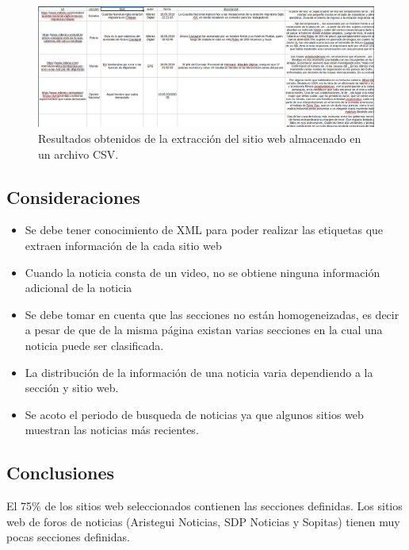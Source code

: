 \begin{figure}[H]
  \centering
  \includegraphics[scale=.27]{imagenes/Capitulo5/9}
  \caption{Resultados obtenidos de la extracción del sitio web almacenado en un archivo CSV.}
  \label{fig:nueve}
\end{figure}

\subsection{Consideraciones}
\begin{itemize}
  \item Se debe tener conocimiento de XML para poder realizar las etiquetas que extraen información de la cada sitio web
  \item Cuando la noticia consta de un video, no se obtiene ninguna información adicional de la noticia
  \item Se debe tomar en cuenta que las secciones no están homogeneizadas, es decir a pesar de que de la misma página existan varias secciones 
en la cual una noticia puede ser clasificada.
  \item La distribución de la información de una noticia varia dependiendo a la sección y sitio web.
  \item Se acoto el periodo de busqueda de noticias ya que algunos sitios web muestran las noticias más recientes.
\end{itemize}

\subsection{Conclusiones}
El 75\% de los sitios web seleccionados contienen las secciones definidas.
Los sitios web de foros de noticias (Aristegui Noticias, SDP Noticias y Sopitas) tienen muy pocas secciones definidas.


